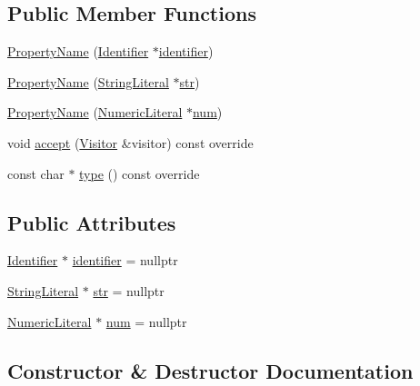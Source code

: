 \subsection*{Public Member Functions}
\begin{DoxyCompactItemize}
\item 
\hyperlink{struct_property_name_af96fbe7ac0c33cf2bccb727851a4adf8}{Property\+Name} (\hyperlink{struct_identifier}{Identifier} $\ast$\hyperlink{struct_property_name_a734bf5af0fe32402402da12b6d5d04a1}{identifier})
\item 
\hyperlink{struct_property_name_a25d0acdb06061901c645912a4f1db913}{Property\+Name} (\hyperlink{struct_string_literal}{String\+Literal} $\ast$\hyperlink{struct_property_name_ac3b7695087df9cdaf188fb6aecce0fa4}{str})
\item 
\hyperlink{struct_property_name_a438f7d48c16360a5c86d20f717d30c39}{Property\+Name} (\hyperlink{struct_numeric_literal}{Numeric\+Literal} $\ast$\hyperlink{struct_property_name_a0b6bd9b7aef3f341f62d1f6a5d46a0c7}{num})
\item 
void \hyperlink{struct_property_name_a95857be8c40022cf788e3b11aa70cdc7}{accept} (\hyperlink{struct_visitor}{Visitor} \&visitor) const override
\item 
const char $\ast$ \hyperlink{struct_property_name_af0476e4cc00bc4ac43adab1050bf1bbd}{type} () const override
\end{DoxyCompactItemize}
\subsection*{Public Attributes}
\begin{DoxyCompactItemize}
\item 
\hyperlink{struct_identifier}{Identifier} $\ast$ \hyperlink{struct_property_name_a734bf5af0fe32402402da12b6d5d04a1}{identifier} = nullptr
\item 
\hyperlink{struct_string_literal}{String\+Literal} $\ast$ \hyperlink{struct_property_name_ac3b7695087df9cdaf188fb6aecce0fa4}{str} = nullptr
\item 
\hyperlink{struct_numeric_literal}{Numeric\+Literal} $\ast$ \hyperlink{struct_property_name_a0b6bd9b7aef3f341f62d1f6a5d46a0c7}{num} = nullptr
\end{DoxyCompactItemize}


\subsection{Constructor \& Destructor Documentation}
\mbox{\label{struct_property_name_af96fbe7ac0c33cf2bccb727851a4adf8}} 
